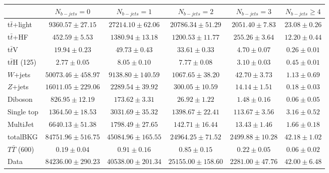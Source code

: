 \begin{tabular}{l c c c c c } \toprule
 & $N_{b-jets}= 0$ & $N_{b-jets}= 1$ & $N_{b-jets}= 2$ & $N_{b-jets}= 3$ & $N_{b-jets}\geq 4$ \\ \midrule 
 t$\bar{t}$+light & $9360.57 \pm 27.15$  & $27214.10 \pm 62.06$  & $20786.34 \pm 51.29$  & $2051.40 \pm 7.83$  & $23.08 \pm 0.26$  \\ 
 t$\bar{t}$+HF & $452.59 \pm 5.53$  & $1380.94 \pm 13.18$  & $1200.53 \pm 11.77$  & $255.26 \pm 3.64$  & $12.20 \pm 0.44$  \\ \midrule 
 t$\bar{t}$V & $19.94 \pm 0.23$  & $49.73 \pm 0.43$  & $33.61 \pm 0.33$  & $4.70 \pm 0.07$  & $0.26 \pm 0.01$  \\ 
 t$\bar{t}$H (125) & $2.77 \pm 0.05$  & $8.05 \pm 0.10$  & $7.77 \pm 0.08$  & $3.10 \pm 0.03$  & $0.45 \pm 0.01$  \\ 
 $W$+jets & $50073.46 \pm 458.97$  & $9138.80 \pm 140.59$  & $1067.65 \pm 38.20$  & $42.70 \pm 3.73$  & $1.13 \pm 0.69$  \\ 
 $Z$+jets & $16011.05 \pm 229.06$  & $2289.54 \pm 39.92$  & $300.05 \pm 10.59$  & $14.14 \pm 1.51$  & $0.18 \pm 0.03$  \\ 
 Diboson & $826.95 \pm 12.19$  & $173.62 \pm 3.31$  & $26.92 \pm 1.22$  & $1.48 \pm 0.16$  & $0.06 \pm 0.05$  \\ 
 Single top & $1364.50 \pm 18.53$  & $3031.69 \pm 35.32$  & $1398.67 \pm 22.41$  & $113.67 \pm 3.56$  & $3.16 \pm 0.52$  \\ 
 MultiJet & $6640.13 \pm 51.38$  & $1798.49 \pm 27.65$  & $142.71 \pm 16.44$  & $13.43 \pm 1.46$  & $1.66 \pm 0.18$  \\ \midrule 
 totalBKG & $84751.96 \pm 516.75$  & $45084.96 \pm 165.55$  & $24964.25 \pm 71.52$  & $2499.88 \pm 10.28$  & $42.18 \pm 1.02$  \\ \midrule 
 $T\bar{T}$ (600) & $0.19 \pm 0.04$  & $0.91 \pm 0.16$  & $0.85 \pm 0.15$  & $0.22 \pm 0.05$  & $0.06 \pm 0.02$  \\ \midrule 
 Data & $84236.00 \pm 290.23$  & $40538.00 \pm 201.34$  & $25155.00 \pm 158.60$  & $2281.00 \pm 47.76$  & $42.00 \pm 6.48$  \\ 
 \bottomrule\end{tabular}